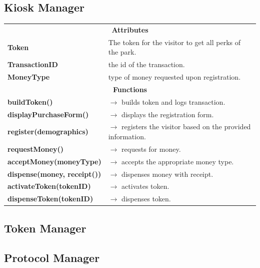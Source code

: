 \documentclass[12pt]{article}
\begin{document}
\subsection{Kiosk Manager}
\begin{table}[H]
\begin{tabularx}{\hsize}{|X|X|}
    \hline
    \rowcolor{kioskgreen}
    \multicolumn{2}{|c|}{\textbf{\texttt{PayKiosk}}} \\
    \hline
    \hline
    \multicolumn{2}{|c|}{\textbf{Attributes}}      \\
    \hline
    \textbf{Token} & The token for the visitor to get all perks of the park.  \\
    \textbf{TransactionID} & the id of the transaction. \\
    \textbf{MoneyType} & type of money requested upon registration. \\
    \hline
    \multicolumn{2}{|c|}{\textbf{Functions}} \\
    \hline
    \textbf{buildToken()} & $\rightarrow$  builds token and logs transaction.\\
    \textbf{displayPurchaseForm()} & $\rightarrow$ displays the registration form. \\
    \textbf{register(demographics)} & $\rightarrow$ registers the visitor based on the provided information. \\
    \textbf{requestMoney()} & $\rightarrow$ requests for money.\\
    \textbf{acceptMoney(moneyType)} & $\rightarrow$ accepts the appropriate money type. \\
    \textbf{dispense(money, receipt())} & $\rightarrow$ dispenses money with receipt. \\
    \textbf{activateToken(tokenID)} & $\rightarrow$ activates token. \\
    \textbf{dispenseToken(tokenID)} & $\rightarrow$ dispenses token. \\
    \hline
\end{tabularx}
\end{table}

\subsection{Token Manager}

\subsection{Protocol Manager}
\end{document}
